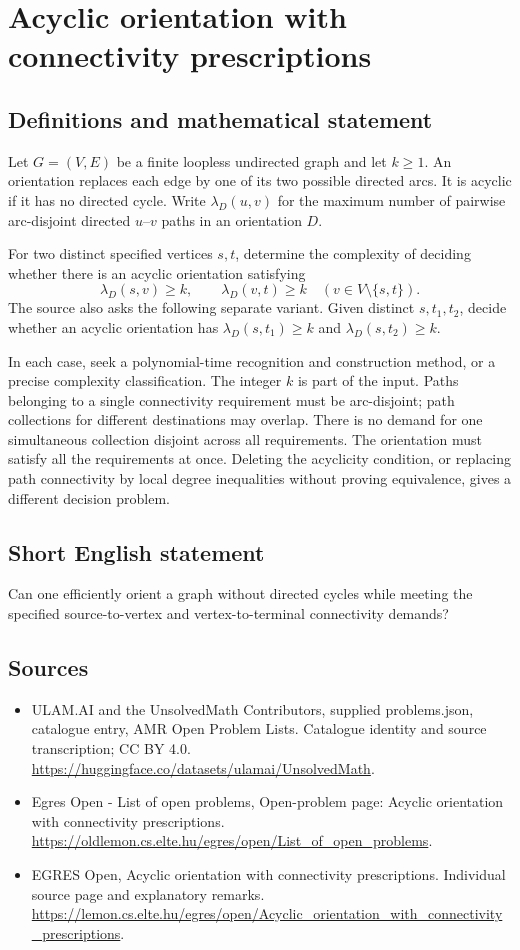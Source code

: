 \documentclass[11pt,a4paper]{article}
\begin{document}
\section*{Acyclic orientation with connectivity prescriptions}\label{statement}

\subsection{Definitions and mathematical statement}
Let $G=(V,E)$ be a finite loopless undirected graph and let $k\ge1$.
An orientation replaces each edge by one of its two possible directed
arcs. It is acyclic if it has no directed cycle. Write $\lambda_D(u,v)$
for the maximum number of pairwise arc-disjoint directed $u$--$v$ paths
in an orientation $D$.

For two distinct specified vertices $s,t$, determine the complexity of
deciding whether there is an acyclic orientation satisfying
\[
 \lambda_D(s,v)\ge k,\qquad \lambda_D(v,t)\ge k
                 \quad(v\in V\setminus\{s,t\}).
\]
The source also asks the following separate variant. Given distinct
$s,t_1,t_2$, decide whether an acyclic orientation has
$\lambda_D(s,t_1)\ge k$ and $\lambda_D(s,t_2)\ge k$.

In each case, seek a polynomial-time recognition and construction method,
or a precise complexity classification. The integer $k$ is part of the
input. Paths belonging to a single connectivity requirement must be
arc-disjoint; path collections for different destinations may overlap.
There is no demand for one simultaneous collection disjoint across all
requirements. The orientation must satisfy all the requirements at once.
Deleting the acyclicity condition, or replacing path connectivity by
local degree inequalities without proving equivalence, gives a different
decision problem.
\subsection{Short English statement}
Can one efficiently orient a graph without directed cycles while
meeting the specified source-to-vertex and vertex-to-terminal connectivity demands?
\subsection{Sources}
\begin{itemize}
\item[S1] ULAM.AI and the UnsolvedMath Contributors, supplied problems.json, catalogue entry, AMR Open Problem Lists. Catalogue identity and source transcription; CC BY 4.0.
\url{https://huggingface.co/datasets/ulamai/UnsolvedMath}.
\item[S2] Egres Open - List of open problems, Open-problem page: Acyclic orientation with connectivity prescriptions. 
\url{https://oldlemon.cs.elte.hu/egres/open/List_of_open_problems}.
\item[S3] EGRES Open, Acyclic orientation with connectivity prescriptions. Individual source page and explanatory remarks.
\url{https://lemon.cs.elte.hu/egres/open/Acyclic_orientation_with_connectivity_prescriptions}.
\end{itemize}
\end{document}
